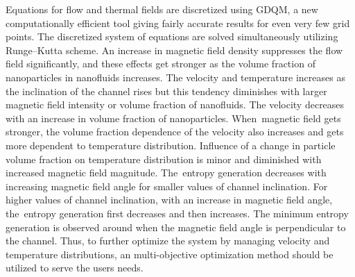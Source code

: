 Equations for flow and thermal fields are discretized using GDQM, a new computationally efficient tool giving fairly accurate results for even very few grid points. The discretized system of equations are solved simultaneously utilizing Runge--Kutta scheme.
 An increase in magnetic field density suppresses the flow field significantly, and these effects get stronger as the volume fraction of nanoparticles in nanofluids increases. The velocity and temperature increases as the inclination of the channel rises but this tendency diminishes with larger magnetic field intensity or volume fraction of nanofluids. The velocity decreases with an increase in volume fraction of nanoparticles. When~magnetic field gets stronger, the volume fraction dependence of the velocity also increases and gets more dependent to temperature distribution. Influence of a change in particle volume fraction on temperature distribution is minor and diminished with increased magnetic field magnitude. The~entropy generation decreases with increasing magnetic field angle for smaller values of channel inclination. For higher values of channel inclination, with an increase in magnetic field angle, 
the~entropy generation first decreases and then increases. The minimum entropy generation is observed around when the magnetic field angle is perpendicular to the channel. Thus, to further optimize the system by managing velocity and temperature distributions, an multi-objective optimization method should be utilized to serve the users needs.
